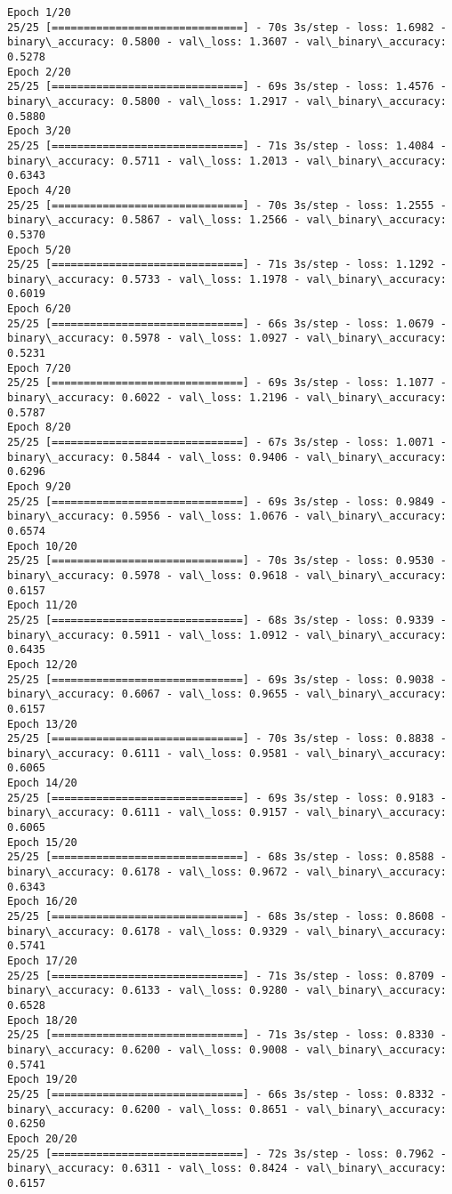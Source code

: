 \documentclass[11pt]{article}
\begin{document}
    \begin{Verbatim}[commandchars=\\\{\}]
Epoch 1/20
25/25 [==============================] - 70s 3s/step - loss: 1.6982 -
binary\_accuracy: 0.5800 - val\_loss: 1.3607 - val\_binary\_accuracy: 0.5278
Epoch 2/20
25/25 [==============================] - 69s 3s/step - loss: 1.4576 -
binary\_accuracy: 0.5800 - val\_loss: 1.2917 - val\_binary\_accuracy: 0.5880
Epoch 3/20
25/25 [==============================] - 71s 3s/step - loss: 1.4084 -
binary\_accuracy: 0.5711 - val\_loss: 1.2013 - val\_binary\_accuracy: 0.6343
Epoch 4/20
25/25 [==============================] - 70s 3s/step - loss: 1.2555 -
binary\_accuracy: 0.5867 - val\_loss: 1.2566 - val\_binary\_accuracy: 0.5370
Epoch 5/20
25/25 [==============================] - 71s 3s/step - loss: 1.1292 -
binary\_accuracy: 0.5733 - val\_loss: 1.1978 - val\_binary\_accuracy: 0.6019
Epoch 6/20
25/25 [==============================] - 66s 3s/step - loss: 1.0679 -
binary\_accuracy: 0.5978 - val\_loss: 1.0927 - val\_binary\_accuracy: 0.5231
Epoch 7/20
25/25 [==============================] - 69s 3s/step - loss: 1.1077 -
binary\_accuracy: 0.6022 - val\_loss: 1.2196 - val\_binary\_accuracy: 0.5787
Epoch 8/20
25/25 [==============================] - 67s 3s/step - loss: 1.0071 -
binary\_accuracy: 0.5844 - val\_loss: 0.9406 - val\_binary\_accuracy: 0.6296
Epoch 9/20
25/25 [==============================] - 69s 3s/step - loss: 0.9849 -
binary\_accuracy: 0.5956 - val\_loss: 1.0676 - val\_binary\_accuracy: 0.6574
Epoch 10/20
25/25 [==============================] - 70s 3s/step - loss: 0.9530 -
binary\_accuracy: 0.5978 - val\_loss: 0.9618 - val\_binary\_accuracy: 0.6157
Epoch 11/20
25/25 [==============================] - 68s 3s/step - loss: 0.9339 -
binary\_accuracy: 0.5911 - val\_loss: 1.0912 - val\_binary\_accuracy: 0.6435
Epoch 12/20
25/25 [==============================] - 69s 3s/step - loss: 0.9038 -
binary\_accuracy: 0.6067 - val\_loss: 0.9655 - val\_binary\_accuracy: 0.6157
Epoch 13/20
25/25 [==============================] - 70s 3s/step - loss: 0.8838 -
binary\_accuracy: 0.6111 - val\_loss: 0.9581 - val\_binary\_accuracy: 0.6065
Epoch 14/20
25/25 [==============================] - 69s 3s/step - loss: 0.9183 -
binary\_accuracy: 0.6111 - val\_loss: 0.9157 - val\_binary\_accuracy: 0.6065
Epoch 15/20
25/25 [==============================] - 68s 3s/step - loss: 0.8588 -
binary\_accuracy: 0.6178 - val\_loss: 0.9672 - val\_binary\_accuracy: 0.6343
Epoch 16/20
25/25 [==============================] - 68s 3s/step - loss: 0.8608 -
binary\_accuracy: 0.6178 - val\_loss: 0.9329 - val\_binary\_accuracy: 0.5741
Epoch 17/20
25/25 [==============================] - 71s 3s/step - loss: 0.8709 -
binary\_accuracy: 0.6133 - val\_loss: 0.9280 - val\_binary\_accuracy: 0.6528
Epoch 18/20
25/25 [==============================] - 71s 3s/step - loss: 0.8330 -
binary\_accuracy: 0.6200 - val\_loss: 0.9008 - val\_binary\_accuracy: 0.5741
Epoch 19/20
25/25 [==============================] - 66s 3s/step - loss: 0.8332 -
binary\_accuracy: 0.6200 - val\_loss: 0.8651 - val\_binary\_accuracy: 0.6250
Epoch 20/20
25/25 [==============================] - 72s 3s/step - loss: 0.7962 -
binary\_accuracy: 0.6311 - val\_loss: 0.8424 - val\_binary\_accuracy: 0.6157
    \end{Verbatim}
\end{document}
